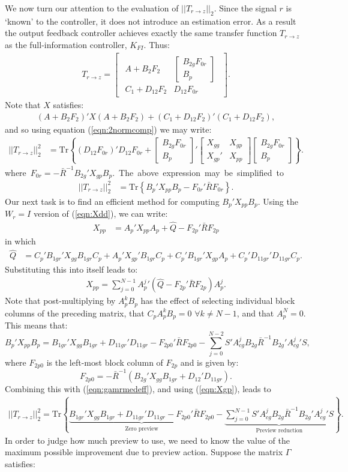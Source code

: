 \documentclass[a4paper,12pt]{article}
\theoremstyle{remark}
\newcommand{\ssmodf}[4]{
        \ma{\begin{array}{c|c }
        #1 & #2 \\ \hline
        #3 & #4
        \end{array}}}
\newcommand{\nrm}[1]{\left|\left| #1 \right|\right|}
\newcommand{\ma}[1]{\begin{bmatrix} #1 \end{bmatrix}}
\newcommand{\als}[1]{\begin{align*} #1 \end{align*}}
\newcommand{\aln}[1]{\begin{align} #1 \end{align}}
\newcommand{\tra}[1]{\textrm{Tr}\left\{ #1 \right\}}
\newcommand{\rf}[1]{{\mathbf{#1}}}
\newcommand{\B}{{\rf{ B}} }
\newcommand{\X}{{\rf{ X}} }
\begin{document}
We now turn our attention to the evaluation of $\nrm{T_{r\rightarrow z}}_2$. Since the signal $r$ is `known' to the controller, it does not introduce an estimation error. As a result the output feedback controller achieves exactly the same transfer function $T_{r\rightarrow z}$ as the full-information controller, $K_{FI}$. Thus:
\als{
T_{r\rightarrow z}=\ssmodf{A+B_2F_2}{\ma{B_{2g}F_{0r}\\B_p}}{C_1+D_{12}F_2}{D_{12}F_{0r}}.
}
%
Note that $X$ satisfies: 
\als{(A+B_2F_2)'X(A+B_2F_2)+(C_1+D_{12}F_2)'(C_1+D_{12}F_2),}
and so using equation (\ref{eqn:2normcomp}) we may write:
\als{
\nrm{T_{r\rightarrow z}}^2_2 &=\tra{\left(D_{12}F_{0r}\right)'D_{12}F_{0r}+\ma{B_{2g}F_{0r}\\B_p}'\ma{X_{gg}&X_{gp}\\X_{gp}'&X_{pp}}\ma{B_{2g}F_{0r}\\B_p}}.
} 
\mbox{where $F_{0r}=-{\bar R}^{-1}B_{2g}'X_{gp}B_p$. The above expression may be simplified to} 
\aln{
\nrm{T_{r\rightarrow z}}^2_2&=\tra{B_p'X_{pp}B_p-F_{0r}'\bar RF_{0r}\label{eqn:gamrmedeff}}.
}
%
Our next task is to find an efficient method for computing $B_p'X_{pp}B_p$. Using the $W_r=I$ version of (\ref{eqn:Xdd}), we can write:
\als{
X_{pp}&=A_p'X_{pp}A_p+\hat Q-F_{2p}'\bar{R}F_{2p}}
in which
\als{
\hat Q &= C_{p}'B_{1gr}'X_{gg}B_{1gr}C_{p}+A_p'X_{gp}'B_{1gr}C_{p}+C_{p}'B_{1gr}'X_{gp}A_p+C_{p}'D_{11gr}'D_{11gr}C_{p}.
}
Substituting this into itself leads to:
\als{
X_{pp}=\sum^{N-1}_{j=0}{A_p^j}'(\hat Q - F_{2p}'\bar{R}F_{2p})A_p^j.
}
%
Note that post-multiplying by $A_p^kB_p$ has the effect of selecting individual block columns of the preceding matrix, that $C_pA_p^kB_p=0 \,\, \forall k \neq N-1$, and that $A_p^N=0$. This means that:
%
\[
B_p'X_{pp}B_p=B_{1gr}'X_{gg}B_{1gr}+D_{11gr}'D_{11gr}-F_{2p0}'\bar{R}F_{2p0} - \sum_{j=0}^{N-2}S' A^j_{cg} B_{2g} {\bar R}^{-1} B_{2g}' {A^j_{cg}}' S,
\]
where $F_{2p0}$ is the left-most block column of $F_{2p}$ and is given by:
\begin{equation}
F_{2p0}=-\bar R^{-1}\left(B_{2g}'X_{gg}B_{1gr}+D_{12}'D_{11gr}\right). \label{eqn:F2p0}
\end{equation}
%
Combining this with (\ref{eqn:gamrmedeff}), and using (\ref{eqn:Xgp}), leads to 
\aln{
\nrm{T_{r\rightarrow z}}^2_2=\tra{\underbrace{B_{1gr}'X_{gg}B_{1gr}+D_{11gr}'D_{11gr}-F_{2p0}'\bar{R}F_{2p0}}_{\mbox{Zero preview}}-\underbrace{\sum_{j=0}^{N-1}S' A^j_{cg} B_{2g}{\bar R}^{-1} B_{2g}'{A^j_{cg}}'S}_{\mbox{Preview reduction}}}.
\label{eqn:H2CostSplit}}
In order to judge how much preview to use, we need to know the value of the maximum possible improvement due to preview action. Suppose the matrix $\Gamma$ satisfies:
\end{document}

